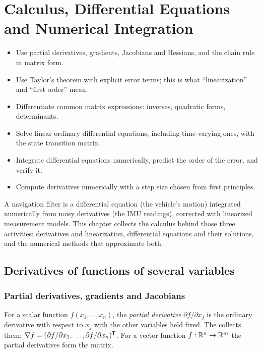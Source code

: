 \chapter{Calculus, Differential Equations and Numerical Integration}
\label{ch:calculus}

\begin{objectives}
\begin{itemize}
  \item Use partial derivatives, gradients, Jacobians and Hessians, and the chain rule in matrix form.
  \item Use Taylor's theorem with explicit error terms; this is what ``linearization'' and ``first order'' mean.
  \item Differentiate common matrix expressions: inverses, quadratic forms, determinants.
  \item Solve linear ordinary differential equations, including time-varying ones, with the state transition matrix.
  \item Integrate differential equations numerically, predict the order of the error, and verify it.
  \item Compute derivatives numerically with a step size chosen from first principles.
\end{itemize}
\end{objectives}

A navigation filter is a differential equation (the vehicle's motion) integrated numerically from noisy derivatives (the IMU
readings), corrected with linearized measurement models. This chapter collects the calculus behind those three activities:
derivatives and linearization, differential equations and their solutions, and the numerical methods that approximate both.

\section{Derivatives of functions of several variables}

\subsection{Partial derivatives, gradients and Jacobians}

For a scalar function $f(x_1, \dots, x_n)$, the \emph{partial derivative} $\partial f/\partial x_j$ is the ordinary derivative with respect to
$x_j$ with the other variables held fixed. The  collects them:
$\nabla f = (\partial f/\partial x_1, \dots, \partial f/\partial x_n)^{\mathsf{T}}$. For a vector function $f: \mathbb{R}^n \to \mathbb{R}^m$ the partial derivatives form the
 matrix.

